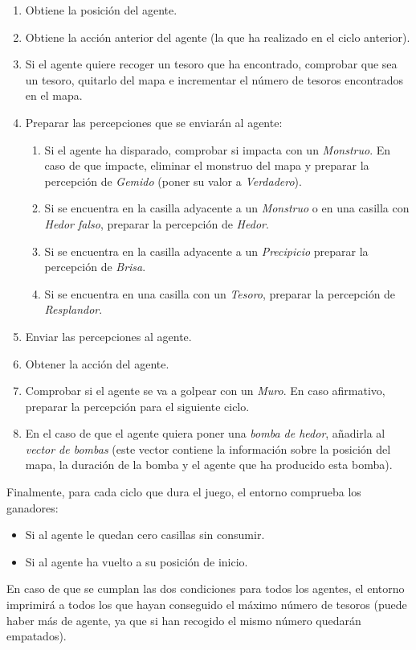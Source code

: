 \begin{enumerate}
    \item Obtiene la posición del agente.
    \item Obtiene la acción anterior del agente (la que ha realizado en el ciclo anterior).
    \item Si el agente quiere recoger un tesoro que ha encontrado, comprobar que sea un tesoro, quitarlo del mapa e incrementar el número de tesoros encontrados en el mapa.
    \item Preparar las percepciones que se enviarán al agente:
    \begin{enumerate}
        \item Si el agente ha disparado, comprobar si impacta con un \emph{Monstruo}. En caso de que impacte, eliminar el monstruo del mapa y preparar la percepción de \emph{Gemido} (poner su valor a \emph{Verdadero}).
        \item Si se encuentra en la casilla adyacente a un \emph{Monstruo} o en una casilla con \emph{Hedor falso}, preparar la percepción de \emph{Hedor}.
        \item Si se encuentra en la casilla adyacente a un \emph{Precipicio} preparar la percepción de \emph{Brisa}.
        \item Si se encuentra en una casilla con un \emph{Tesoro}, preparar la percepción de \emph{Resplandor}.
    \end{enumerate}
    
    \item Enviar las percepciones al agente.
    \item Obtener la acción del agente.
    \item Comprobar si el agente se va a golpear con un \emph{Muro}. En caso afirmativo, preparar la percepción para el siguiente ciclo.
    \item En el caso de que el agente quiera poner una \emph{bomba de hedor}, añadirla al \emph{vector de bombas} (este vector contiene la información sobre la posición del mapa, la duración de la bomba y el agente que ha producido esta bomba).
\end{enumerate}

Finalmente, para cada ciclo que dura el juego, el entorno comprueba los ganadores: 

\begin{itemize}
    \item Si al agente le quedan cero casillas sin consumir.
    \item Si al agente ha vuelto a su posición de inicio.
\end{itemize}

En caso de que se cumplan las dos condiciones para todos los agentes, el entorno imprimirá a todos los que hayan conseguido el máximo número de tesoros (puede haber más de agente, ya que si han recogido el mismo número quedarán empatados).